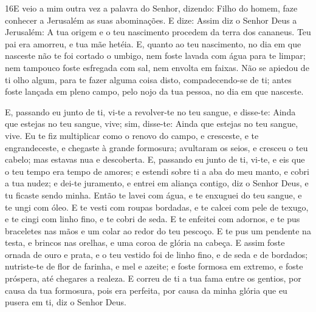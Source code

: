 \medskip

\lettrine{16} E veio a mim outra vez a palavra do Senhor,
dizendo: Filho do homem, faze conhecer a Jerusalém as suas
abominações. E dize: Assim diz o Senhor Deus a Jerusalém: A tua
origem e o teu nascimento procedem da terra dos cananeus. Teu pai
era amorreu, e tua mãe hetéia. E, quanto ao teu nascimento, no
dia em que nasceste não te foi cortado o umbigo, nem foste lavada
com água para te limpar; nem tampouco foste esfregada com sal, nem
envolta em faixas. Não se apiedou de ti olho algum, para te
fazer alguma coisa disto, compadecendo-se de ti; antes foste lançada
em pleno campo, pelo nojo da tua pessoa, no dia em que nasceste.

E, passando eu junto de ti, vi-te a revolver-te no teu sangue, e
disse-te: Ainda que estejas no teu sangue, vive; sim, disse-te:
Ainda que estejas no teu sangue, vive. Eu te fiz multiplicar
como o renovo do campo, e cresceste, e te engrandeceste, e chegaste
à grande formosura; avultaram os seios, e cresceu o teu cabelo; mas
estavas nua e descoberta. E, passando eu junto de ti, vi-te, e
eis que o teu tempo era tempo de amores; e estendi sobre ti a aba do
meu manto, e cobri a tua nudez; e dei-te juramento, e entrei em
aliança contigo, diz o Senhor Deus, e tu ficaste sendo minha.
Então te lavei com água, e te enxuguei do teu sangue, e te ungi
com óleo. E te vesti com roupas bordadas, e te calcei com
pele de texugo, e te cingi com linho fino, e te cobri de seda.
E te enfeitei com adornos, e te pus braceletes nas mãos e um
colar ao redor do teu pescoço. E te pus um pendente na testa,
e brincos nas orelhas, e uma coroa de glória na cabeça. E
assim foste ornada de ouro e prata, e o teu vestido foi de linho
fino, e de seda e de bordados; nutriste-te de flor de farinha, e mel
e azeite; e foste formosa em extremo, e foste próspera, até chegares
a realeza. E correu de ti a tua fama entre os gentios, por
causa da tua formosura, pois era perfeita, por causa da minha glória
que eu pusera em ti, diz o Senhor Deus.


